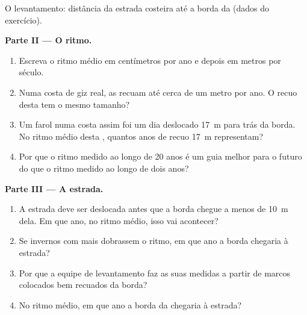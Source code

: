 \begin{problem}
\begin{omfigure}
{\small O levantamento: distância da estrada costeira até a borda da
 (dados do exercício).}
\label{fig:g9:landforms:survey}
\end{omfigure}

\noindent\textbf{Parte II --- O ritmo.}\par\nopagebreak
\begin{enumerate}[resume, beginpenalty=10000]
  \item Escreva o ritmo médio em centímetros por ano e depois em metros
        por século.
  \item Numa costa de giz real, as  recuam até cerca de um metro
        por ano. O recuo desta  tem o mesmo tamanho?
  \item Um farol numa costa assim foi um dia deslocado \qty{17}{m} para
        trás da borda. No ritmo médio desta , quantos anos de recuo
        \qty{17}{m} representam?
  \item Por que o ritmo medido ao longo de 20 anos é um guia melhor para o
        futuro do que o ritmo medido ao longo de dois anos?
\end{enumerate}

\noindent\textbf{Parte III --- A estrada.}\par\nopagebreak
\begin{enumerate}[resume, beginpenalty=10000]
  \item A estrada deve ser deslocada antes que a borda chegue a menos de
        \qty{10}{m} dela. Em que ano, no ritmo médio, isso vai acontecer?
  \item Se invernos com mais  dobrassem o ritmo, em que ano a
        borda chegaria à estrada?
  \item Por que a equipe de levantamento faz as suas medidas a partir de
        marcos colocados bem recuados da borda?
  \item No ritmo médio, em que ano a borda da  chegaria à estrada?
\end{enumerate}
\end{problem}
